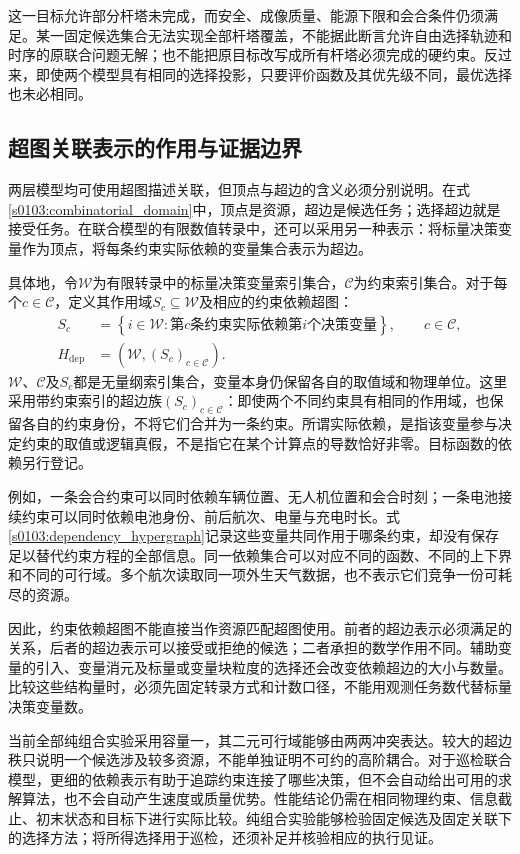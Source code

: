 这一目标允许部分杆塔未完成，而安全、成像质量、能源下限和会合条件仍须满足。某一固定候选集合无法实现全部杆塔覆盖，不能据此断言允许自由选择轨迹和时序的原联合问题无解；也不能把原目标改写成所有杆塔必须完成的硬约束。反过来，即使两个模型具有相同的选择投影，只要评价函数及其优先级不同，最优选择也未必相同。

\subsection{超图关联表示的作用与证据边界}

两层模型均可使用超图描述关联，但顶点与超边的含义必须分别说明。在式\eqref{s0103:combinatorial_domain}中，顶点是资源，超边是候选任务；选择超边就是接受任务。在联合模型的有限数值转录中，还可以采用另一种表示：将标量决策变量作为顶点，将每条约束实际依赖的变量集合表示为超边。

具体地，令$\mathcal W$为有限转录中的标量决策变量索引集合，$\mathcal C$为约束索引集合。对于每个$c\in\mathcal C$，定义其作用域$S_c\subseteq\mathcal W$及相应的约束依赖超图：
\begin{align}
 S_c&=\left\{i\in\mathcal W:
       \text{第$c$条约束实际依赖第$i$个决策变量}\right\},
       \qquad c\in\mathcal C,
 \label{s0103:constraint_scope}\\
 H_{\mathrm{dep}}
 &=\left(\mathcal W,(S_c)_{c\in\mathcal C}\right).
 \label{s0103:dependency_hypergraph}
\end{align}
$\mathcal W$、$\mathcal C$及$S_c$都是无量纲索引集合，变量本身仍保留各自的取值域和物理单位。这里采用带约束索引的超边族$(S_c)_{c\in\mathcal C}$：即使两个不同约束具有相同的作用域，也保留各自的约束身份，不将它们合并为一条约束。所谓实际依赖，是指该变量参与决定约束的取值或逻辑真假，不是指它在某个计算点的导数恰好非零。目标函数的依赖另行登记。

例如，一条会合约束可以同时依赖车辆位置、无人机位置和会合时刻；一条电池接续约束可以同时依赖电池身份、前后航次、电量与充电时长。式\eqref{s0103:dependency_hypergraph}记录这些变量共同作用于哪条约束，却没有保存足以替代约束方程的全部信息。同一依赖集合可以对应不同的函数、不同的上下界和不同的可行域。多个航次读取同一项外生天气数据，也不表示它们竞争一份可耗尽的资源。

因此，约束依赖超图不能直接当作资源匹配超图使用。前者的超边表示必须满足的关系，后者的超边表示可以接受或拒绝的候选；二者承担的数学作用不同。辅助变量的引入、变量消元及标量或变量块粒度的选择还会改变依赖超边的大小与数量。比较这些结构量时，必须先固定转录方式和计数口径，不能用观测任务数代替标量决策变量数。

当前全部纯组合实验采用容量一，其二元可行域能够由两两冲突表达。较大的超边秩只说明一个候选涉及较多资源，不能单独证明不可约的高阶耦合。对于巡检联合模型，更细的依赖表示有助于追踪约束连接了哪些决策，但不会自动给出可用的求解算法，也不会自动产生速度或质量优势。性能结论仍需在相同物理约束、信息截止、初末状态和目标下进行实际比较。纯组合实验能够检验固定候选及固定关联下的选择方法；将所得选择用于巡检，还须补足并核验相应的执行见证。
